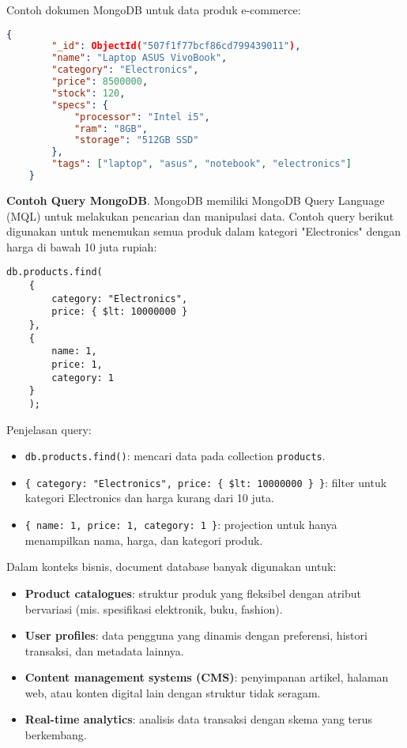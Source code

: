 Contoh dokumen MongoDB untuk data produk e-commerce:

\begin{lstlisting}[language=json, caption={Contoh dokumen produk dalam MongoDB}, label={lst:mongodb_product}]
	{
		"_id": ObjectId("507f1f77bcf86cd799439011"),
		"name": "Laptop ASUS VivoBook",
		"category": "Electronics",
		"price": 8500000,
		"stock": 120,
		"specs": {
			"processor": "Intel i5",
			"ram": "8GB",
			"storage": "512GB SSD"
		},
		"tags": ["laptop", "asus", "notebook", "electronics"]
	}
\end{lstlisting}

\textbf{Contoh Query MongoDB}. MongoDB memiliki MongoDB Query Language (MQL) untuk melakukan pencarian dan manipulasi data. Contoh query berikut digunakan untuk menemukan semua produk dalam kategori "Electronics" dengan harga di bawah 10 juta rupiah:

\begin{lstlisting}[style=JavaScript, caption={Contoh query MongoDB untuk menemukan produk elektronik dengan harga < 10 juta}, label={lst:mongodb_query}]
	db.products.find(
	{ 
		category: "Electronics", 
		price: { $lt: 10000000 } 
	},
	{
		name: 1,
		price: 1,
		category: 1
	}
	);
\end{lstlisting}

Penjelasan query:
\begin{itemize}
	\item \texttt{db.products.find()}: mencari data pada collection \texttt{products}.
	\item \texttt{\{ category: "Electronics", price: \{ \$lt: 10000000 \} \}}: filter untuk kategori Electronics dan harga kurang dari 10 juta.
	\item \texttt{\{ name: 1, price: 1, category: 1 \}}: projection untuk hanya menampilkan nama, harga, dan kategori produk.
\end{itemize}

Dalam konteks bisnis, document database banyak digunakan untuk:
\begin{itemize}
	\item \textbf{Product catalogues}: struktur produk yang fleksibel dengan atribut bervariasi (mis. spesifikasi elektronik, buku, fashion).
	\item \textbf{User profiles}: data pengguna yang dinamis dengan preferensi, histori transaksi, dan metadata lainnya.
	\item \textbf{Content management systems (CMS)}: penyimpanan artikel, halaman web, atau konten digital lain dengan struktur tidak seragam.
	\item \textbf{Real-time analytics}: analisis data transaksi dengan skema yang terus berkembang.
\end{itemize}

